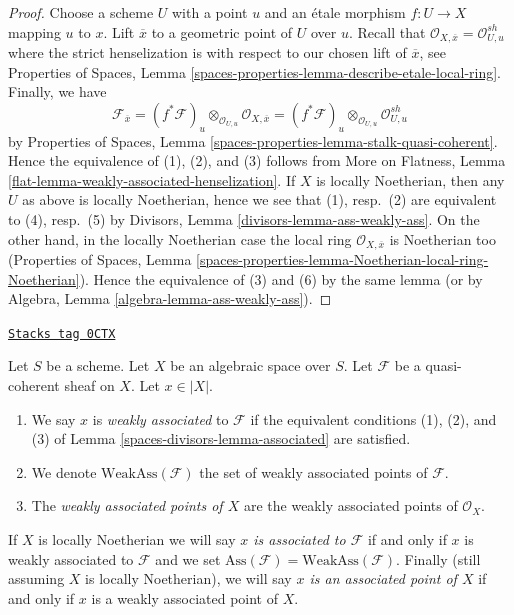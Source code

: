 \begin{proof}
Choose a scheme $U$ with a point $u$ and an \'etale morphism
$f : U \to X$ mapping $u$ to $x$. Lift $\overline{x}$ to a geometric
point of $U$ over $u$. Recall that
$\mathcal{O}_{X, \overline{x}} = \mathcal{O}_{U, u}^{sh}$
where the strict henselization is with respect to our chosen
lift of $\overline{x}$, see
Properties of Spaces, Lemma
\ref{spaces-properties-lemma-describe-etale-local-ring}.
Finally, we have
$$
\mathcal{F}_{\overline{x}} =
(f^*\mathcal{F})_u \otimes_{\mathcal{O}_{U, u}}
\mathcal{O}_{X, \overline{x}} =
(f^*\mathcal{F})_u \otimes_{\mathcal{O}_{U, u}}
\mathcal{O}_{U, u}^{sh}
$$
by
Properties of Spaces, Lemma \ref{spaces-properties-lemma-stalk-quasi-coherent}.
Hence the equivalence of (1), (2), and (3) follows from
More on Flatness, Lemma \ref{flat-lemma-weakly-associated-henselization}.
If $X$ is locally Noetherian, then
any $U$ as above is locally Noetherian,
hence we see that (1), resp.\ (2) are equivalent to (4), resp.\ (5) by
Divisors, Lemma \ref{divisors-lemma-ass-weakly-ass}.
On the other hand, in the locally Noetherian case the
local ring $\mathcal{O}_{X, \overline{x}}$ is Noetherian too
(Properties of Spaces, Lemma
\ref{spaces-properties-lemma-Noetherian-local-ring-Noetherian}).
Hence the equivalence of (3) and (6) by the same lemma
(or by Algebra, Lemma \ref{algebra-lemma-ass-weakly-ass}).
\end{proof}

\begin{definition}
\label{spaces-divisors-definition-weakly-associated}
\href{https://stacks.math.columbia.edu/tag/0CTX}{\texttt{Stacks tag 0CTX}}

Let $S$ be a scheme. Let $X$ be an algebraic space over $S$.
Let $\mathcal{F}$ be a quasi-coherent sheaf on $X$.
Let $x \in |X|$.
\begin{enumerate}
\item We say $x$ is {\it weakly associated} to $\mathcal{F}$
if the equivalent conditions (1), (2), and (3) of
Lemma \ref{spaces-divisors-lemma-associated} are satisfied.
\item We denote $\text{WeakAss}(\mathcal{F})$ the set of weakly associated
points of $\mathcal{F}$.
\item The {\it weakly associated points of $X$} are the weakly associated
points of $\mathcal{O}_X$.
\end{enumerate}
If $X$ is locally Noetherian we will say
{\it $x$ is associated to $\mathcal{F}$}
if and only if $x$ is weakly associated to $\mathcal{F}$ and we set
$\text{Ass}(\mathcal{F}) = \text{WeakAss}(\mathcal{F})$.
Finally (still assuming $X$ is locally Noetherian),
we will say {\it $x$ is an associated point of $X$} if and only if
$x$ is a weakly associated point of $X$.
\end{definition}

